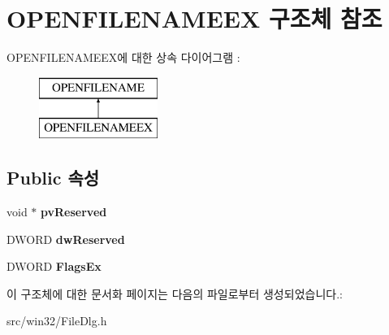 \hypertarget{struct_o_p_e_n_f_i_l_e_n_a_m_e_e_x}{}\section{O\+P\+E\+N\+F\+I\+L\+E\+N\+A\+M\+E\+EX 구조체 참조}
\label{struct_o_p_e_n_f_i_l_e_n_a_m_e_e_x}
O\+P\+E\+N\+F\+I\+L\+E\+N\+A\+M\+E\+E\+X에 대한 상속 다이어그램 \+: \begin{figure}[H]
\begin{center}
\leavevmode
\includegraphics[height=2.000000cm]{struct_o_p_e_n_f_i_l_e_n_a_m_e_e_x}
\end{center}
\end{figure}
\subsection*{Public 속성}
\begin{DoxyCompactItemize}
\item 
\mbox{\label{struct_o_p_e_n_f_i_l_e_n_a_m_e_e_x_a7a86ce8d401fd1e27346e6ed40ece33a}} 
void $\ast$ {\bfseries pv\+Reserved}
\item 
\mbox{\label{struct_o_p_e_n_f_i_l_e_n_a_m_e_e_x_a81b2e87ff9ffc00a50e73b3bc6a25e17}} 
D\+W\+O\+RD {\bfseries dw\+Reserved}
\item 
\mbox{\label{struct_o_p_e_n_f_i_l_e_n_a_m_e_e_x_a287159f9ba4611835b31d46af8ddba6d}} 
D\+W\+O\+RD {\bfseries Flags\+Ex}
\end{DoxyCompactItemize}


이 구조체에 대한 문서화 페이지는 다음의 파일로부터 생성되었습니다.\+:\begin{DoxyCompactItemize}
\item 
src/win32/File\+Dlg.\+h\end{DoxyCompactItemize}
